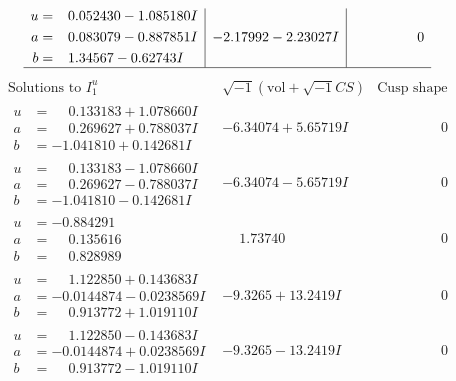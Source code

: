 \documentclass[1p]{elsarticle_modified}
\theoremstyle{definition}
\newcommand{\I}{\sqrt{-1}}
\begin{document}
$$\begin{array}{c|c|c}
\begin{aligned}
u &= \phantom{-}0.052430 - 1.085180 I \\
a &= \phantom{-}0.083079 - 0.887851 I \\
b &= \phantom{-}1.34567 - 0.62743 I\end{aligned}
 & -2.17992 - 2.23027 I & \phantom{-0.000000 } 0\\
 \hline 
 \end{array}$$\newpage$$\begin{array}{c|c|c}  
\text{Solutions to }I^u_{1}& \I (\text{vol} + \sqrt{-1}CS) & \text{Cusp shape}\\
 \hline 
\begin{aligned}
u &= \phantom{-}0.133183 + 1.078660 I \\
a &= \phantom{-}0.269627 + 0.788037 I \\
b &= -1.041810 + 0.142681 I\end{aligned}
 & -6.34074 + 5.65719 I & \phantom{-0.000000 } 0 \\ \hline\begin{aligned}
u &= \phantom{-}0.133183 - 1.078660 I \\
a &= \phantom{-}0.269627 - 0.788037 I \\
b &= -1.041810 - 0.142681 I\end{aligned}
 & -6.34074 - 5.65719 I & \phantom{-0.000000 } 0 \\ \hline\begin{aligned}
u &= -0.884291\phantom{ +0.000000I} \\
a &= \phantom{-}0.135616\phantom{ +0.000000I} \\
b &= \phantom{-}0.828989\phantom{ +0.000000I}\end{aligned}
 & \phantom{-}1.73740\phantom{ +0.000000I} & \phantom{-0.000000 } 0 \\ \hline\begin{aligned}
u &= \phantom{-}1.122850 + 0.143683 I \\
a &= -0.0144874 - 0.0238569 I \\
b &= \phantom{-}0.913772 + 1.019110 I\end{aligned}
 & -9.3265 + 13.2419 I & \phantom{-0.000000 } 0 \\ \hline\begin{aligned}
u &= \phantom{-}1.122850 - 0.143683 I \\
a &= -0.0144874 + 0.0238569 I \\
b &= \phantom{-}0.913772 - 1.019110 I\end{aligned}
 & -9.3265 - 13.2419 I & \phantom{-0.000000 } 0 \\ \hline\begin{aligned}

\end{aligned}
\end{array}$$
\end{document}
